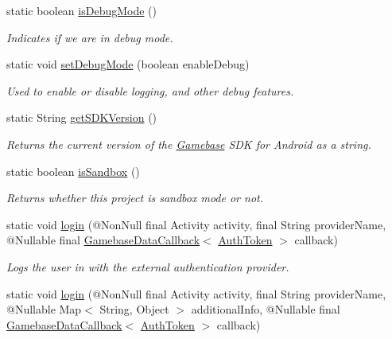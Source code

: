 \begin{DoxyCompactItemize}
static boolean \hyperlink{classcom_1_1toast_1_1android_1_1gamebase_1_1_gamebase_ac53b9593245b674244afe37606ec15c6}{is\+Debug\+Mode} ()
\begin{DoxyCompactList}\small\item\em Indicates if we are in debug mode. \end{DoxyCompactList}\item 
static void \hyperlink{classcom_1_1toast_1_1android_1_1gamebase_1_1_gamebase_a4370928bb241d35d896feb65e206a7d4}{set\+Debug\+Mode} (boolean enable\+Debug)
\begin{DoxyCompactList}\small\item\em Used to enable or disable logging, and other debug features. \end{DoxyCompactList}\item 
static String \hyperlink{classcom_1_1toast_1_1android_1_1gamebase_1_1_gamebase_aeb5168abbd62c631b65247e6289d1e2d}{get\+S\+D\+K\+Version} ()
\begin{DoxyCompactList}\small\item\em Returns the current version of the \hyperlink{classcom_1_1toast_1_1android_1_1gamebase_1_1_gamebase}{Gamebase} S\+DK for Android as a string. \end{DoxyCompactList}\item 
static boolean \hyperlink{classcom_1_1toast_1_1android_1_1gamebase_1_1_gamebase_ab2dc0892a980b519fd76e15bcecb3bb5}{is\+Sandbox} ()
\begin{DoxyCompactList}\small\item\em Returns whether this project is sandbox mode or not. \end{DoxyCompactList}\item 
static void \hyperlink{classcom_1_1toast_1_1android_1_1gamebase_1_1_gamebase_a277a8a1672aeb0ac6b20e7ebcd4e09b5}{login} (@Non\+Null final Activity activity, final String provider\+Name, @Nullable final \hyperlink{interfacecom_1_1toast_1_1android_1_1gamebase_1_1_gamebase_data_callback}{Gamebase\+Data\+Callback}$<$ \hyperlink{classcom_1_1toast_1_1android_1_1gamebase_1_1auth_1_1data_1_1_auth_token}{Auth\+Token} $>$ callback)
\begin{DoxyCompactList}\small\item\em Logs the user in with the external authentication provider. \end{DoxyCompactList}\item 
static void \hyperlink{classcom_1_1toast_1_1android_1_1gamebase_1_1_gamebase_aff74a9c4ea1a737026d9507d6e9827e8}{login} (@Non\+Null final Activity activity, final String provider\+Name, @Nullable Map$<$ String, Object $>$ additional\+Info, @Nullable final \hyperlink{interfacecom_1_1toast_1_1android_1_1gamebase_1_1_gamebase_data_callback}{Gamebase\+Data\+Callback}$<$ \hyperlink{classcom_1_1toast_1_1android_1_1gamebase_1_1auth_1_1data_1_1_auth_token}{Auth\+Token} $>$ callback)

\end{DoxyCompactItemize}
